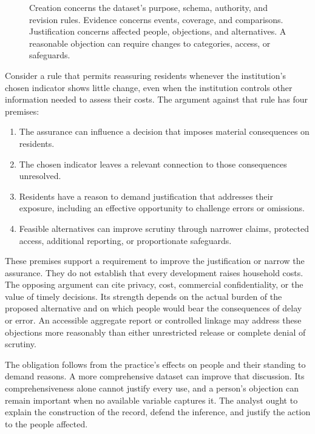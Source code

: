 \begin{figure}[htbp]
\centering

\caption{Creation concerns the dataset’s purpose, schema, authority, and revision rules. Evidence concerns events, coverage, and comparisons. Justification concerns affected people, objections, and alternatives. A reasonable objection can require changes to categories, access, or safeguards.}\label{fig:M09_artifact_justification}
\end{figure}

Consider a rule that permits reassuring residents whenever the
institution's chosen indicator shows little change, even when the
institution controls other information needed to assess their costs. The
argument against that rule has four premises:

\begin{enumerate}
\def\labelenumi{\arabic{enumi}.}
\tightlist
\item
  The assurance can influence a decision that imposes material
  consequences on residents.
\item
  The chosen indicator leaves a relevant connection to those
  consequences unresolved.
\item
  Residents have a reason to demand justification that addresses their
  exposure, including an effective opportunity to challenge errors or
  omissions.
\item
  Feasible alternatives can improve scrutiny through narrower claims,
  protected access, additional reporting, or proportionate safeguards.
\end{enumerate}

These premises support a requirement to improve the justification or
narrow the assurance. They do not establish that every development
raises household costs. The opposing argument can cite privacy, cost,
commercial confidentiality, or the value of timely decisions. Its
strength depends on the actual burden of the proposed alternative and on
which people would bear the consequences of delay or error. An
accessible aggregate report or controlled linkage may address these
objections more reasonably than either unrestricted release or complete
denial of scrutiny.

The obligation follows from the practice's effects on people and their
standing to demand reasons. A more comprehensive dataset can improve
that discussion. Its comprehensiveness alone cannot justify every use,
and a person's objection can remain important when no available variable
captures it. The analyst ought to explain the construction of the
record, defend the inference, and justify the action to the people
affected.

